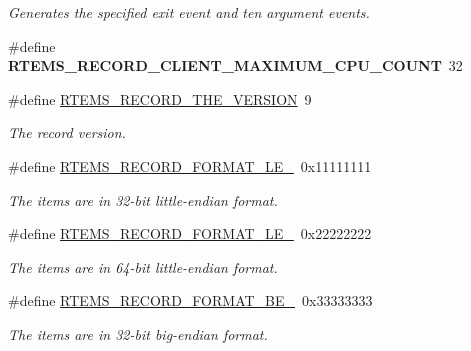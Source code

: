 \begin{DoxyCompactItemize}
\begin{DoxyCompactList}\small\item\em Generates the specified exit event and ten argument events. \end{DoxyCompactList}\item 
\mbox{\label{group__RTEMSRecord_ga54e5b6024017876ab719ee0e2bc1a361}} 
\#define {\bfseries R\+T\+E\+M\+S\+\_\+\+R\+E\+C\+O\+R\+D\+\_\+\+C\+L\+I\+E\+N\+T\+\_\+\+M\+A\+X\+I\+M\+U\+M\+\_\+\+C\+P\+U\+\_\+\+C\+O\+U\+NT}~32
\item 
\#define \mbox{\hyperlink{group__RTEMSRecord_gaa449476bd4e08ac99b32f137efdaa00d}{R\+T\+E\+M\+S\+\_\+\+R\+E\+C\+O\+R\+D\+\_\+\+T\+H\+E\+\_\+\+V\+E\+R\+S\+I\+ON}}~9
\begin{DoxyCompactList}\small\item\em The record version. \end{DoxyCompactList}\item 
\mbox{\label{group__RTEMSRecord_gaecb3adb1d7a42fb88a185d734c07dc6e}} 
\#define \mbox{\hyperlink{group__RTEMSRecord_gaecb3adb1d7a42fb88a185d734c07dc6e}{R\+T\+E\+M\+S\+\_\+\+R\+E\+C\+O\+R\+D\+\_\+\+F\+O\+R\+M\+A\+T\+\_\+\+L\+E\+\_}}~0x11111111
\begin{DoxyCompactList}\small\item\em The items are in 32-\/bit little-\/endian format. \end{DoxyCompactList}\item 
\mbox{\label{group__RTEMSRecord_ga79959f1a6619f001b2734bd3dbdadd74}} 
\#define \mbox{\hyperlink{group__RTEMSRecord_ga79959f1a6619f001b2734bd3dbdadd74}{R\+T\+E\+M\+S\+\_\+\+R\+E\+C\+O\+R\+D\+\_\+\+F\+O\+R\+M\+A\+T\+\_\+\+L\+E\+\_}}~0x22222222
\begin{DoxyCompactList}\small\item\em The items are in 64-\/bit little-\/endian format. \end{DoxyCompactList}\item 
\mbox{\label{group__RTEMSRecord_ga562d211c9ffa59d33c28c458c04d5315}} 
\#define \mbox{\hyperlink{group__RTEMSRecord_ga562d211c9ffa59d33c28c458c04d5315}{R\+T\+E\+M\+S\+\_\+\+R\+E\+C\+O\+R\+D\+\_\+\+F\+O\+R\+M\+A\+T\+\_\+\+B\+E\+\_}}~0x33333333
\begin{DoxyCompactList}\small\item\em The items are in 32-\/bit big-\/endian format. \end{DoxyCompactList}\item 

\end{DoxyCompactItemize}
